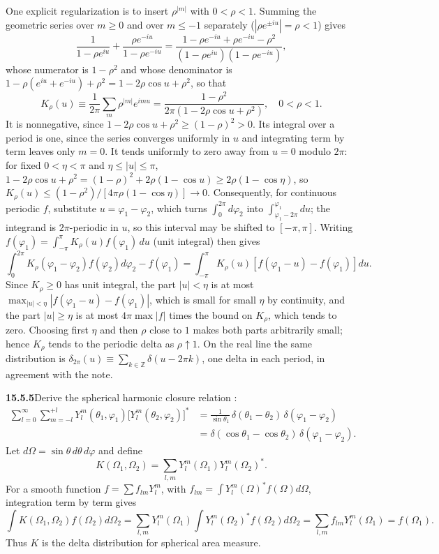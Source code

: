 One explicit regularization is to insert $\rho^{|m|}$ with
$0<\rho<1$. Summing the geometric series over $m\ge0$ and over
$m\le-1$ separately ($|\rho e^{\pm iu}|=\rho<1$) gives
\[
\frac1{1-\rho e^{iu}}+\frac{\rho e^{-iu}}{1-\rho e^{-iu}}
=\frac{1-\rho e^{-iu}+\rho e^{-iu}-\rho^2}
{(1-\rho e^{iu})(1-\rho e^{-iu})},
\]
whose numerator is $1-\rho^2$ and whose denominator is
$1-\rho(e^{iu}+e^{-iu})+\rho^2=1-2\rho\cos u+\rho^2$, so that
\[
K_\rho(u)\equiv\frac1{2\pi}\sum_m\rho^{|m|}e^{imu}
=\frac{1-\rho^2}{2\pi(1-2\rho\cos u+\rho^2)},\quad 0<\rho<1.
\]
It is nonnegative, since $1-2\rho\cos u+\rho^2\ge(1-\rho)^2>0$. Its
integral over a period is one, since the series converges uniformly
in $u$ and integrating term by term leaves only $m=0$. It tends
uniformly to zero away from $u=0$ modulo $2\pi$: for fixed
$0<\eta<\pi$ and $\eta\le|u|\le\pi$,
$1-2\rho\cos u+\rho^2=(1-\rho)^2+2\rho(1-\cos u)\ge2\rho(1-\cos\eta)$,
so $K_\rho(u)\le(1-\rho^2)/[4\pi\rho(1-\cos\eta)]\to0$.
Consequently, for continuous periodic $f$, substitute
$u=\varphi_1-\varphi_2$, which turns $\int_0^{2\pi}d\varphi_2$ into
$\int_{\varphi_1-2\pi}^{\varphi_1}du$; the integrand is $2\pi$-periodic
in $u$, so this interval may be shifted to $[-\pi,\pi]$. Writing
$f(\varphi_1)=\int_{-\pi}^{\pi}K_\rho(u)f(\varphi_1)\,du$ (unit
integral) then gives
\[
\int_0^{2\pi}K_\rho(\varphi_1-\varphi_2)f(\varphi_2)d\varphi_2
-f(\varphi_1)
=\int_{-\pi}^{\pi}K_\rho(u)[f(\varphi_1-u)-f(\varphi_1)]du.
\]
Since $K_\rho\ge0$ has unit integral, the part $|u|<\eta$ is at most
$\max_{|u|<\eta}|f(\varphi_1-u)-f(\varphi_1)|$, which is small for
small $\eta$ by continuity, and the part $|u|\ge\eta$ is at most
$4\pi\max|f|$ times the bound on $K_\rho$, which tends to zero.
Choosing first $\eta$ and then $\rho$ close to $1$ makes both parts
arbitrarily small; hence $K_\rho$ tends to the periodic delta as
$\rho\uparrow1$.
On the real line the same distribution is
$\delta_{2\pi}(u)\equiv\sum_{k\in\mathbb Z}\delta(u-2\pi k)$, one delta
in each period, in agreement with the note.

\par\bigskip
\noindent\textbf{15.5.5}\quad Derive the spherical harmonic closure
relation :
\begin{align*}
\sum_{l=0}^{\infty}\sum_{m=-l}^{+l}
Y_{l}^{m}(\theta_{1},\varphi_{1})
\big[Y_{l}^{m}(\theta_{2},\varphi_{2})\big]^{*}
&=\frac{1}{\sin\theta_{1}}\,\delta(\theta_{1}-\theta_{2})\,
\delta(\varphi_{1}-\varphi_{2})\\
&=\delta(\cos\theta_{1}-\cos\theta_{2})\,
\delta(\varphi_{1}-\varphi_{2}).
\end{align*}
\solution
Let $d\Omega=\sin\theta\,d\theta\,d\varphi$ and define
\[
K(\Omega_1,\Omega_2)=\sum_{l,m}
Y_l^m(\Omega_1)Y_l^m(\Omega_2)^*.
\]
For a smooth function $f=\sum f_{lm}Y_l^m$, with
$f_{lm}=\int Y_l^m(\Omega)^*f(\Omega)d\Omega$, integration term by term
gives
\[
\int K(\Omega_1,\Omega_2)f(\Omega_2)d\Omega_2
=\sum_{l,m}Y_l^m(\Omega_1)\int Y_l^m(\Omega_2)^*f(\Omega_2)d\Omega_2
=\sum_{l,m}f_{lm}Y_l^m(\Omega_1)=f(\Omega_1).
\]
Thus $K$ is the delta distribution for spherical area measure.

